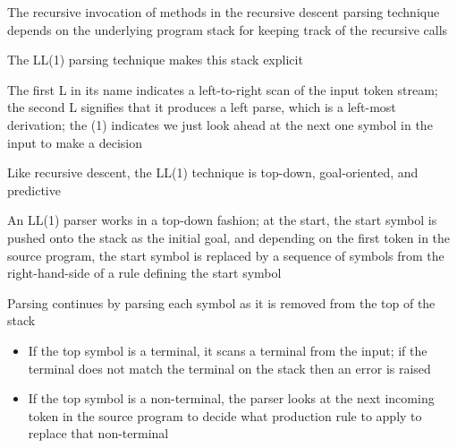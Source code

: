 \documentclass[8pt,a4paper,compress,handout]{beamer}
\begin{document}
\begin{frame}[fragile]
\pause

The recursive invocation of methods in the recursive descent parsing technique depends on the underlying program stack for keeping track of the recursive calls

\pause
\bigskip

The LL(1) parsing technique makes this stack explicit

\pause
\bigskip

The first L in its name indicates a left-to-right scan of the input token stream; the second L signifies that it produces a left parse, which is a left-most derivation; the (1) indicates we just look ahead at the next one symbol in the input to make a decision

\pause
\bigskip

Like recursive descent, the LL(1) technique is top-down, goal-oriented, and predictive

\pause
\bigskip

An LL(1) parser works in a top-down fashion; at the start, the start symbol is pushed onto the stack as the initial goal, and depending on the first token in the source program, the start symbol is replaced by a sequence of symbols from the right-hand-side of a rule defining the start symbol

\pause
\bigskip

Parsing continues by parsing each symbol as it is removed from the top of the stack
\begin{itemize}
\item If the top symbol is a terminal, it scans a terminal from the input; if the terminal does not match the terminal on the stack then an error is raised
\item If the top symbol is a non-terminal, the parser looks at the next incoming token in the source program to decide what production rule to apply to replace that non-terminal
\end{itemize}
\end{frame}
\end{document}
